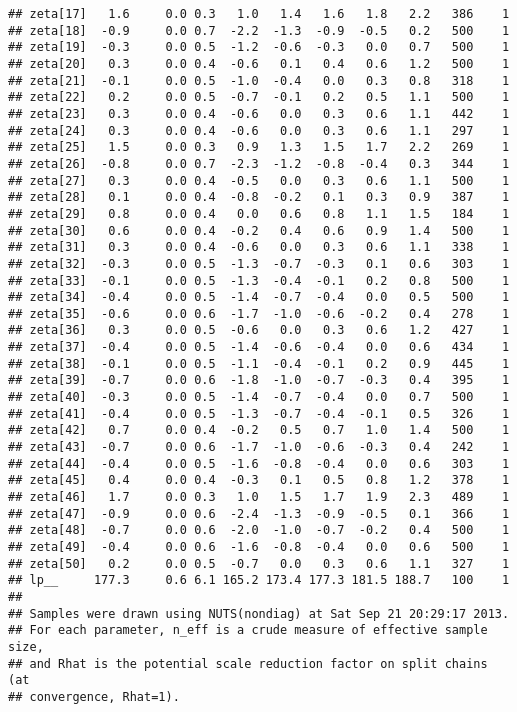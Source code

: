 \documentclass{article}\usepackage[]{graphicx}\usepackage[]{color}
\makeatletter
\newenvironment{kframe}{%
 \def\at@end@of@kframe{}%
 \ifinner\ifhmode%
  \def\at@end@of@kframe{\end{minipage}}%
  \begin{minipage}{\columnwidth}%
 \fi\fi%
 \def\FrameCommand##1{\hskip\@totalleftmargin \hskip-\fboxsep
 \colorbox{shadecolor}{##1}\hskip-\fboxsep
     \hskip-\linewidth \hskip-\@totalleftmargin \hskip\columnwidth}%
 \MakeFramed {\advance\hsize-\width
   \@totalleftmargin\z@ \linewidth\hsize
   \@setminipage}}%
 {\par\unskip\endMakeFramed%
 \at@end@of@kframe}
\newenvironment{knitrout}{}{} %
\makeatother
\begin{document}
\begin{knitrout}
\begin{kframe}
\begin{verbatim}
## zeta[17]   1.6     0.0 0.3   1.0   1.4   1.6   1.8   2.2   386    1
## zeta[18]  -0.9     0.0 0.7  -2.2  -1.3  -0.9  -0.5   0.2   500    1
## zeta[19]  -0.3     0.0 0.5  -1.2  -0.6  -0.3   0.0   0.7   500    1
## zeta[20]   0.3     0.0 0.4  -0.6   0.1   0.4   0.6   1.2   500    1
## zeta[21]  -0.1     0.0 0.5  -1.0  -0.4   0.0   0.3   0.8   318    1
## zeta[22]   0.2     0.0 0.5  -0.7  -0.1   0.2   0.5   1.1   500    1
## zeta[23]   0.3     0.0 0.4  -0.6   0.0   0.3   0.6   1.1   442    1
## zeta[24]   0.3     0.0 0.4  -0.6   0.0   0.3   0.6   1.1   297    1
## zeta[25]   1.5     0.0 0.3   0.9   1.3   1.5   1.7   2.2   269    1
## zeta[26]  -0.8     0.0 0.7  -2.3  -1.2  -0.8  -0.4   0.3   344    1
## zeta[27]   0.3     0.0 0.4  -0.5   0.0   0.3   0.6   1.1   500    1
## zeta[28]   0.1     0.0 0.4  -0.8  -0.2   0.1   0.3   0.9   387    1
## zeta[29]   0.8     0.0 0.4   0.0   0.6   0.8   1.1   1.5   184    1
## zeta[30]   0.6     0.0 0.4  -0.2   0.4   0.6   0.9   1.4   500    1
## zeta[31]   0.3     0.0 0.4  -0.6   0.0   0.3   0.6   1.1   338    1
## zeta[32]  -0.3     0.0 0.5  -1.3  -0.7  -0.3   0.1   0.6   303    1
## zeta[33]  -0.1     0.0 0.5  -1.3  -0.4  -0.1   0.2   0.8   500    1
## zeta[34]  -0.4     0.0 0.5  -1.4  -0.7  -0.4   0.0   0.5   500    1
## zeta[35]  -0.6     0.0 0.6  -1.7  -1.0  -0.6  -0.2   0.4   278    1
## zeta[36]   0.3     0.0 0.5  -0.6   0.0   0.3   0.6   1.2   427    1
## zeta[37]  -0.4     0.0 0.5  -1.4  -0.6  -0.4   0.0   0.6   434    1
## zeta[38]  -0.1     0.0 0.5  -1.1  -0.4  -0.1   0.2   0.9   445    1
## zeta[39]  -0.7     0.0 0.6  -1.8  -1.0  -0.7  -0.3   0.4   395    1
## zeta[40]  -0.3     0.0 0.5  -1.4  -0.7  -0.4   0.0   0.7   500    1
## zeta[41]  -0.4     0.0 0.5  -1.3  -0.7  -0.4  -0.1   0.5   326    1
## zeta[42]   0.7     0.0 0.4  -0.2   0.5   0.7   1.0   1.4   500    1
## zeta[43]  -0.7     0.0 0.6  -1.7  -1.0  -0.6  -0.3   0.4   242    1
## zeta[44]  -0.4     0.0 0.5  -1.6  -0.8  -0.4   0.0   0.6   303    1
## zeta[45]   0.4     0.0 0.4  -0.3   0.1   0.5   0.8   1.2   378    1
## zeta[46]   1.7     0.0 0.3   1.0   1.5   1.7   1.9   2.3   489    1
## zeta[47]  -0.9     0.0 0.6  -2.4  -1.3  -0.9  -0.5   0.1   366    1
## zeta[48]  -0.7     0.0 0.6  -2.0  -1.0  -0.7  -0.2   0.4   500    1
## zeta[49]  -0.4     0.0 0.6  -1.6  -0.8  -0.4   0.0   0.6   500    1
## zeta[50]   0.2     0.0 0.5  -0.7   0.0   0.3   0.6   1.1   327    1
## lp__     177.3     0.6 6.1 165.2 173.4 177.3 181.5 188.7   100    1
## 
## Samples were drawn using NUTS(nondiag) at Sat Sep 21 20:29:17 2013.
## For each parameter, n_eff is a crude measure of effective sample size,
## and Rhat is the potential scale reduction factor on split chains (at 
## convergence, Rhat=1).
\end{verbatim}
\end{kframe}
\end{knitrout}
\end{document}
